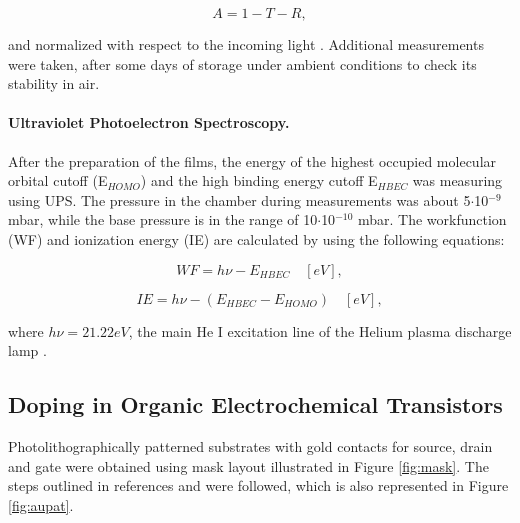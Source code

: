 \begin{equation}\label{eq:abs}
	A = 1 - T - R,
\end{equation}

and normalized with respect to the incoming light \cite{uvvis}. Additional measurements were taken, after some days of storage under ambient conditions to check its stability in air.

\paragraph{Ultraviolet Photoelectron Spectroscopy.}After the preparation of the films, %
the energy of the highest occupied molecular orbital cutoff (E$_{HOMO}$) and the high binding energy cutoff E$_{HBEC}$ was measuring using UPS. The pressure in the chamber during measurements was about 5$\cdot$10$^{-9}$ mbar, while the base pressure is in the range of 10$\cdot$10$^{-10}$ mbar. The workfunction (WF) and ionization energy (IE) are calculated by using the following equations:

\begin{equation}\label{eq:wf}
	WF = h\nu - E_{HBEC} \quad [eV],
\end{equation}

\begin{equation}\label{eq:ie}
	IE = h\nu - (E_{HBEC}-E_{HOMO}) \quad [eV],
\end{equation}

where $h\nu = 21.22 eV$, the main He I excitation line of the Helium plasma discharge lamp \cite{buchholtzDopingPropertiesNovel2021}. 
 

\subsection{Doping in Organic Electrochemical Transistors} \label{subsec:oect}

Photolithographically patterned substrates with gold contacts for source, drain and gate were obtained using mask layout illustrated in Figure \ref{fig:mask}. The steps outlined in references \cite{weissbachPhotopatternableSolidElectrolyte2022} and \cite{bongartzOrganicElectrochemicalTransistors2021} were followed, which is also represented in Figure \ref{fig:aupat}.

